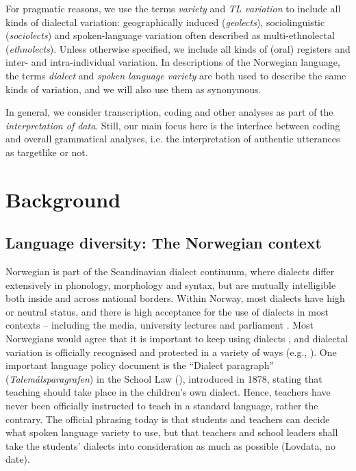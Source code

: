 \documentclass[output=paper,colorlinks,citecolor=brown,modfonts,nonflat]{../langscibook}
\begin{document}
For pragmatic reasons, we use the terms \textit{variety} and \textit{TL variation} to include all kinds of dialectal variation: geographically induced (\textit{geolects}), sociolinguistic (\textit{sociolects}) and spoken-language variation often described as multi-ethnolectal (\textit{ethnolects}). Unless otherwise specified, we include all kinds of (oral) registers and inter- and intra-individual variation. In descriptions of the Norwegian language, the terms \textit{dialect} and \textit{spoken language variety} are both used to describe the same kinds of variation, and we will also use them as synonymous.

In general, we consider transcription, coding and other analyses as part of the \textit{interpretation of data}. Still, our main focus here is the interface between coding and overall grammatical analyses, i.e. the interpretation of authentic utterances as targetlike or not.

\section{Background}\label{sec:emilsen:2}
\subsection{Language diversity: The Norwegian context}\label{sec:emilsen:2.1}

Norwegian is part of the Scandinavian dialect continuum, where dialects differ extensively in phonology, morphology and syntax, but are mutually intelligible both inside and across national borders. Within Norway, most dialects have high or neutral status, and there is high acceptance for the use of dialects in most contexts – including the media, university lectures and parliament \citep{Røyneland2009, Sandøy2011}. Most Norwegians would agree that it is important to keep using dialects \citep{Røyneland2009}, and dialectal variation is officially recognised and protected in a variety of ways (e.g., \citealt[31]{Trudgill2002}). One important language policy document is the ``Dialect paragraph'' (\textit{Talemålsparagrafen}) in the School Law (\citealt{LovdataND}), introduced in 1878, stating that teaching should take place in the children’s own dialect. Hence, teachers have never been officially instructed to teach in a standard language, rather the contrary. The official phrasing today is that students and teachers can decide what spoken language variety to use, but that teachers and school leaders shall take the students’ dialects into consideration as much as possible (Lovdata, no date).
\end{document}
